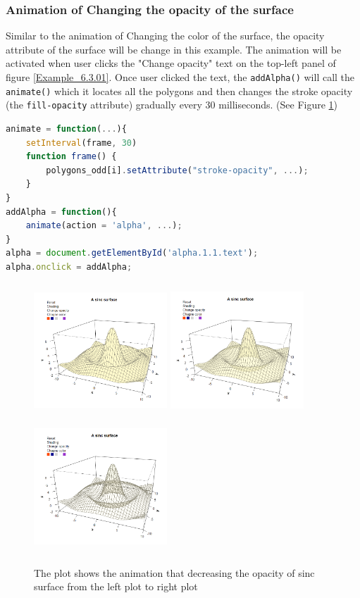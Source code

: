 \documentclass[11pt,twoside]{report}
\begin{document}
\newpage
\subsubsection*{Animation of Changing the opacity of the surface}
Similar to the animation of Changing the color of the surface, the opacity attribute of the surface will be change in this example. The animation will be activated when user clicks the "Change opacity" text on the top-left panel of figure \ref{Example_6.3.01}. Once user clicked the text, the \texttt{addAlpha()} will call the \texttt{animate()} which it locates all the polygons and then changes the stroke opacity (the \texttt{fill-opacity} attribute) gradually every 30 milliseconds. (See Figure \ref{Example_6.3.2})
\begin{lstlisting}[language = JavaScript]
animate = function(...){
    setInterval(frame, 30)
    function frame() {
        polygons_odd[i].setAttribute("stroke-opacity", ...);
    }
}
addAlpha = function(){
    animate(action = 'alpha', ...);
}
alpha = document.getElementById('alpha.1.1.text');
alpha.onclick = addAlpha; 
\end{lstlisting}

\begin{figure}[h]
	\begin{center}
		\includegraphics[height = 5cm, width = 5cm]{figure/svg/origin_1.PNG}
		\includegraphics[height = 5cm, width = 5cm]{figure/svg/opacity_2.PNG}
		\includegraphics[height = 5cm, width = 5cm]{figure/svg/opacity_3.PNG}
		\caption{The plot shows the animation that decreasing the opacity of sinc surface from the left plot to right plot}
		\label{Example_6.3.2}
	\end{center}
\end{figure}
\end{document}
